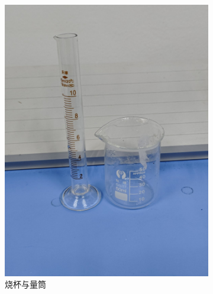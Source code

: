 \documentclass[a4paper]{report} %
\begin{document}
\begin{figure}[htbp]
\begin{subfigure}{0.22\textwidth}
        \includegraphics[width=\linewidth]{烧杯与量筒.jpg}
        \caption{烧杯与量筒}
    \end{subfigure}
    \begin{subfigure}{0.22\textwidth}

\end{subfigure}
\end{figure}
\end{document}
